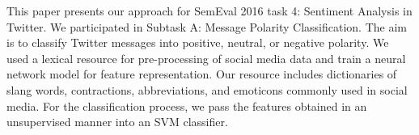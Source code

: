 This paper presents our approach for SemEval 2016 task 4: Sentiment Analysis in Twitter. We participated in Subtask A: Message Polarity Classification. The aim is to classify Twitter messages into positive, neutral, or negative polarity. We used a lexical resource for pre-processing of social media data and train a neural network model for feature representation. Our resource includes dictionaries of slang words, contractions, abbreviations, and emoticons commonly used in social media. For the classification process, we pass the features obtained in an unsupervised manner into an SVM classifier.
